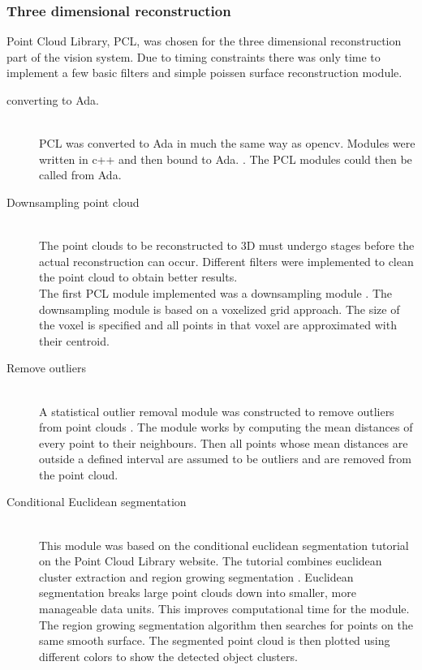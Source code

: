\subsubsection{Three dimensional reconstruction} 
Point Cloud Library, PCL, was chosen for the three dimensional reconstruction part of the vision system. Due to timing constraints there was only time to implement a few basic filters and simple poissen surface reconstruction module.
\begin{description}
\item[converting to Ada.]\hfill \\
PCL was converted to Ada in much the same way as opencv. Modules were written in c++ and then bound to Ada. \cite{web:newAdaBindings}. The PCL modules could then be called from Ada.

\item[Downsampling point cloud]\hfill \\
The point clouds to be reconstructed to 3D must undergo stages before the actual reconstruction can occur. Different filters were implemented to clean the point cloud to obtain better results.
\\The first PCL module implemented was a downsampling module \cite{web:pclVoxel} . The downsampling module is based on a voxelized grid approach. The size of the voxel is specified and all points in that voxel are approximated with their centroid.	

\item[Remove outliers]\hfill \\
A statistical outlier removal module was constructed to remove outliers from point clouds \cite{web:pclOutliers}. The module works by computing the mean distances of every point to their neighbours. Then all points whose mean distances are outside a defined interval are assumed to be outliers and are removed from the point cloud.

\item[Conditional Euclidean segmentation]\hfill \\
This module was based on the conditional euclidean segmentation tutorial on the Point Cloud Library website\cite{web:PCL}. The tutorial combines euclidean cluster extraction \cite{RusuDoctoralDissertation} and region growing segmentation \cite{web:pclRegionGrowing}. Euclidean segmentation breaks large point clouds down into smaller, more manageable data units. This improves computational time for the module. The region growing segmentation algorithm then searches for points on the same smooth surface. The segmented point cloud is then plotted using different colors to show the detected object clusters. 
\end{description}